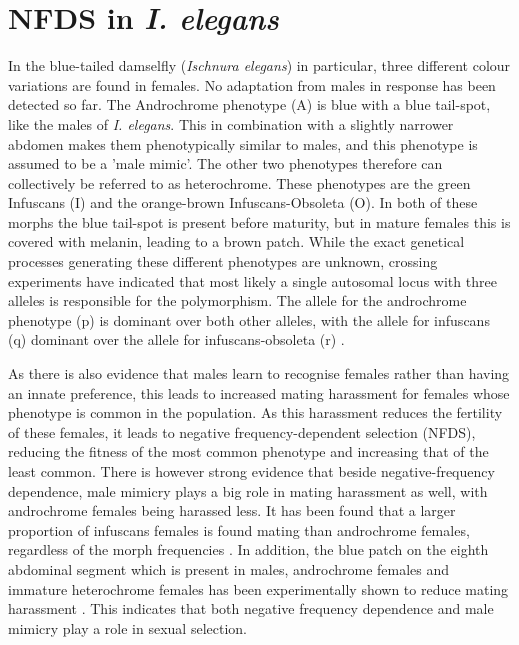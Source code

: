 \documentclass{article}
\begin{document}
\section{NFDS in \textit{I. elegans}}
In the blue-tailed damselfly (\textit{Ischnura elegans}) in particular, three different colour variations are found in females. No adaptation from males in response has been detected so far. The Androchrome phenotype (A) is blue with a blue tail-spot, like the males of \textit{I. elegans}. This in combination with a slightly narrower abdomen makes them phenotypically similar to males, and this phenotype is assumed to be a 'male mimic'. The other two phenotypes therefore can collectively be referred to as heterochrome. These phenotypes are the green Infuscans (I) and the orange-brown Infuscans-Obsoleta (O). In both of these morphs the blue tail-spot is present before maturity, but in mature females this is covered with melanin, leading to a brown patch. While the exact genetical processes generating these different phenotypes are unknown, crossing experiments have indicated that most likely a single autosomal locus with three alleles is responsible for the polymorphism\cite{Cordero1990}. The allele for the androchrome phenotype (p) is dominant over both other alleles, with the allele for infuscans (q) dominant over the allele for infuscans-obsoleta (r) \cite{Cordero1990}.

As there is also evidence that males learn to recognise females rather than having an innate preference, this leads to increased mating harassment for females whose phenotype is common in the population. As this harassment reduces the fertility of these females, it leads to negative frequency-dependent selection (NFDS), reducing the fitness of the most common phenotype and increasing that of the least common.
There is however strong evidence that beside negative-frequency dependence, male mimicry plays a big role in mating harassment as well, with androchrome females being harassed less. It has been found that a larger proportion of infuscans females is found mating than androchrome females, regardless of the morph frequencies \cite{Gosden2009}. In addition, the blue patch on the eighth abdominal segment which is present in males, androchrome females and immature heterochrome females has been experimentally shown to reduce mating harassment \cite{Willink2019}. This indicates that both negative frequency dependence and male mimicry play a role in sexual selection.
\end{document}
